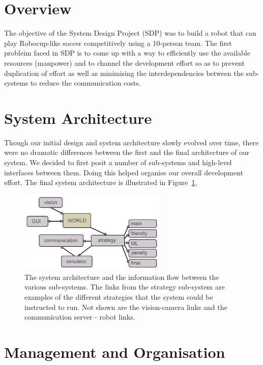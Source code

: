 \documentclass[12pt,a4paper,notitlepage,twocolumn]{report}
\date{}
\begin{document}


\section*{Overview}
The objective of the System Design Project (SDP) was to build a robot
that can play Robocup-like soccer competitively using a 10-person
team. The first probleim faced in SDP is to come up with a way to
efficiently use the available resources (manpower) and to channel the
development effort so as to prevent duplication of effort as well as
minimising the interdependencies between the sub-systems to reduce the
communication costs.

\section*{System Architecture}
Though our initial design and system architecture slowly evolved over
time, there were no dramatic differences between the first and the
final architecture of our system. We decided to first posit a number
of sub-systems and high-level interfaces between them. Doing this
helped organise our overall development effort. The final system
architecture is illustrated in Figure~\ref{fig:arch}.

\begin{figure} [ht]
  \centering
  \includegraphics[width=70mm]{arch.png}
  \caption{The system architecture and the information flow between
    the various sub-systems. The links from the strategy sub-system
    are examples of the different strategies that the system could be
    instructed to run. Not shown are the vision-camera links and the
    communication server - robot links.}
  \label{fig:arch}
\end{figure}

\section*{Management and Organisation}
\end{document}
